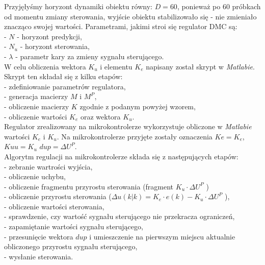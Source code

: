 \documentclass[a4paper, 10pt]{article}
\begin{document}
Przyjęłyśmy horyzont dynamiki obiektu równy: $D=60$, ponieważ po 60 próbkach od momentu zmiany sterowania, wyjście obiektu stabilizowało się - nie zmieniało znacząco swojej wartości.
Parametrami, jakimi stroi się regulator DMC są:\\
- $N$ - horyzont predykcji,\\
- $N_{u}$ - horyzont sterowania,\\
- $\lambda$ - parametr kary za zmieny sygnału sterującego.\\
W celu obliczenia wektora $K_{u}$ i elementu $K_{e}$ napisany został skrypt w \textit{Matlabie}.  Skrypt ten składał się z kilku etapów:\\
- zdefiniowanie parametrów regulatora,\\
- generacja macierzy $M$ i $M^{P}$, \\
- obliczenie macierzy $K$ zgodnie z podanym powyżej wzorem,\\
- obliczenie wartości $K_{e}$ oraz wektora $K_{u}$.\\
Regulator zrealizowany na mikrokontrolerze wykorzystuje obliczone w \textit{Matlabie} wartości $K_{e}$ i $K_{u}$. Na mikrokontrolerze przyjęte zostały oznaczenia $Ke=K_{e}$, $Kuu=K_{u}$ $dup=\Delta U^{P}$.\\
Algorytm regulacji na mikrokontrolerze składa się z następujących etapów:\\
- zebranie wartrości wyjścia,\\
- obliczenie uchybu,\\
- obliczenie fragmentu przyrostu sterowania (fragment $K_{u} \cdot \Delta U^{P}$ )\\
- obliczenie przyrostu sterowania ($\Delta u(k|k)= K_{e} \cdot e(k) - K_{u} \cdot \Delta U^{P}$ ), \\
- obliczenie wartości sterowania, \\
- sprawdzenie, czy wartość sygnału sterującego nie przekracza ograniczeń, \\
- zapamiętanie wartości sygnału sterującego, \\
- przesunięcie wektora $dup$ i umieszczenie na pierwszym miejscu aktualnie obliczonego przyrostu sygnału sterującego,\\
- wysłanie sterowania.
\end{document}
